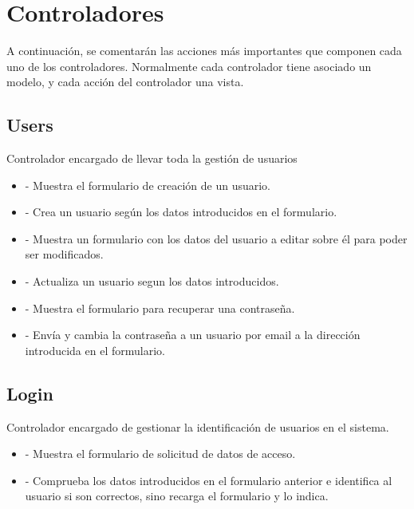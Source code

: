 \section{Controladores}

A continuación, se comentarán las acciones más importantes que componen cada uno de los controladores. Normalmente cada controlador tiene asociado un modelo, y cada acción del controlador una vista.

\subsection{Users}

Controlador encargado de llevar toda la gestión de usuarios

\begin{itemize}
\item {} - Muestra el formulario de creación de un usuario.
\item {} - Crea un usuario según los datos introducidos en el formulario.
\item {} - Muestra un formulario con los datos del usuario a editar sobre él para poder ser modificados.
\item {} - Actualiza un usuario segun los datos introducidos.
\item {} - Muestra el formulario para recuperar una contraseña.
\item {} - Envía y cambia la contraseña a un usuario por email a la dirección introducida en el formulario.
\end{itemize}

\subsection{Login}

Controlador encargado de gestionar la identificación de usuarios en el sistema.

\begin{itemize}
\item {} - Muestra el formulario de solicitud de datos de acceso.
\item {} - Comprueba los datos introducidos en el formulario anterior e identifica al usuario si son correctos, sino recarga el formulario y lo indica.
\end{itemize}

